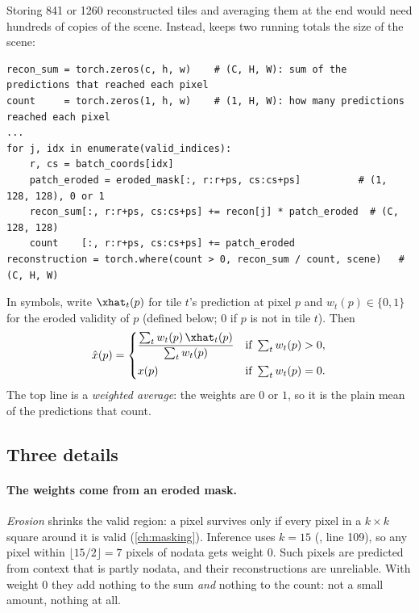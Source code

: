 Storing 841 or 1260 reconstructed tiles and averaging them at the end would need hundreds of copies of the
scene. Instead,  keeps two running totals the size of the scene:
\begin{lstlisting}
recon_sum = torch.zeros(c, h, w)    # (C, H, W): sum of the predictions that reached each pixel
count     = torch.zeros(1, h, w)    # (1, H, W): how many predictions reached each pixel
...
for j, idx in enumerate(valid_indices):
    r, cs = batch_coords[idx]
    patch_eroded = eroded_mask[:, r:r+ps, cs:cs+ps]          # (1, 128, 128), 0 or 1
    recon_sum[:, r:r+ps, cs:cs+ps] += recon[j] * patch_eroded  # (C, 128, 128)
    count    [:, r:r+ps, cs:cs+ps] += patch_eroded
reconstruction = torch.where(count > 0, recon_sum / count, scene)   # (C, H, W)
\end{lstlisting}
In symbols, write $\xhat_t(p)$ for tile $t$'s prediction at pixel $p$ and $w_t(p)\in\{0,1\}$ for the eroded
validity of $p$ (defined below; $0$ if $p$ is not in tile $t$). Then
\begin{equation}
\hat{x}(p)=
\begin{cases}
\dfrac{\sum_t w_t(p)\,\xhat_t(p)}{\sum_t w_t(p)} & \text{if } \sum_t w_t(p)>0,\\[2ex]
x(p) & \text{if } \sum_t w_t(p)=0.
\end{cases}
\label{eq:inference:average}
\end{equation}
The top line is a \emph{weighted average}: the weights are $0$ or $1$, so it is the
plain mean of the predictions that count.

\subsection{Three details}

\paragraph{The weights come from an eroded mask.}
\emph{Erosion} shrinks the valid region: a pixel survives only if every pixel in a
$k\times k$ square around it is valid (\cref{ch:masking}). Inference uses $k=15$
(, line 109), so any pixel within $\lfloor15/2\rfloor=7$ pixels of nodata gets
weight $0$. Such pixels are predicted from context that is partly nodata, and their reconstructions are
unreliable. With weight $0$ they add nothing to the sum \emph{and} nothing to the count: not a small
amount, nothing at all.

